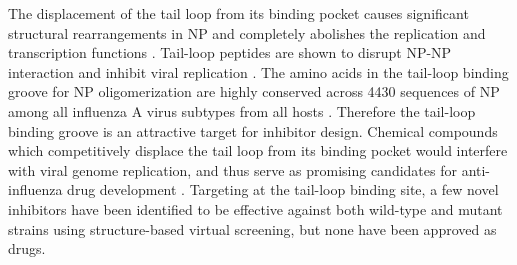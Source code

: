 
The displacement of the tail loop from its binding pocket causes significant structural rearrangements in NP and completely abolishes the replication and transcription functions \citep{1231}. Tail-loop peptides are shown to disrupt NP-NP interaction and inhibit viral replication \citep{1233}. The amino acids in the tail-loop binding groove for NP oligomerization are highly conserved across 4430 sequences of NP among all influenza A virus subtypes from all hosts \citep{1513}. Therefore the tail-loop binding groove is an attractive target for inhibitor design. Chemical compounds which competitively displace the tail loop from its binding pocket would interfere with viral genome replication, and thus serve as promising candidates for anti-influenza drug development \citep{1140,1231,1232,1233}. Targeting at the tail-loop binding site, a few novel inhibitors \citep{1233} have been identified to be effective against both wild-type and mutant strains using structure-based virtual screening, but none have been approved as drugs.%

